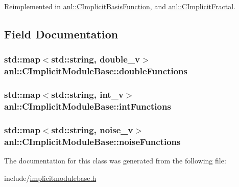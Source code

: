 Reimplemented in \hyperlink{classanl_1_1CImplicitBasisFunction_a1fba23e4d106edd9cdc44dd52e116d2d}{anl::CImplicitBasisFunction}, and \hyperlink{classanl_1_1CImplicitFractal_ad50523033bd36b13bbc21aaa3def0499}{anl::CImplicitFractal}.

\subsection{Field Documentation}
\hypertarget{classanl_1_1CImplicitModuleBase_a44d78c30f32d9def6ad5a28f3831e5cb}{
\subsubsection[{doubleFunctions}]{\setlength{\rightskip}{0pt plus 5cm}std::map$<$std::string, {\bf double\_\-v}$>$ {\bf anl::CImplicitModuleBase::doubleFunctions}}}
\label{classanl_1_1CImplicitModuleBase_a44d78c30f32d9def6ad5a28f3831e5cb}
\hypertarget{classanl_1_1CImplicitModuleBase_a6b667cd64feb2e8345fcf68eadc565e3}{
\subsubsection[{intFunctions}]{\setlength{\rightskip}{0pt plus 5cm}std::map$<$std::string, {\bf int\_\-v}$>$ {\bf anl::CImplicitModuleBase::intFunctions}}}
\label{classanl_1_1CImplicitModuleBase_a6b667cd64feb2e8345fcf68eadc565e3}
\hypertarget{classanl_1_1CImplicitModuleBase_abeee324fb88e1ea014ac6595b9a98d16}{
\subsubsection[{noiseFunctions}]{\setlength{\rightskip}{0pt plus 5cm}std::map$<$std::string, {\bf noise\_\-v}$>$ {\bf anl::CImplicitModuleBase::noiseFunctions}}}
\label{classanl_1_1CImplicitModuleBase_abeee324fb88e1ea014ac6595b9a98d16}


The documentation for this class was generated from the following file:\begin{DoxyCompactItemize}
\item 
include/\hyperlink{implicitmodulebase_8h}{implicitmodulebase.h}\end{DoxyCompactItemize}
